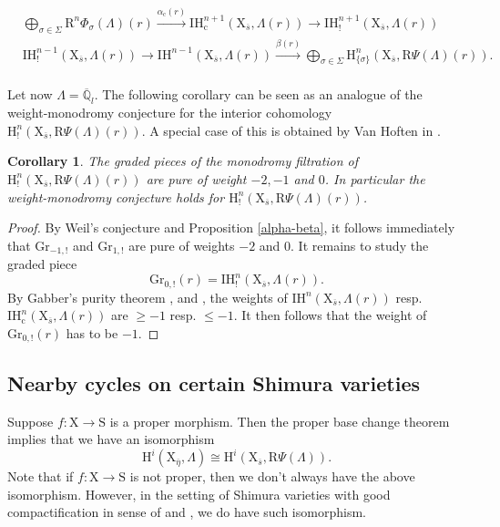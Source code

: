 \documentclass[10pt]{amsart}
\numberwithin{equation}{section}
\newtheorem{corollary}[equation]{Corollary}
\theoremstyle{definition}
\def\QQ{\mathbb{Q}}
\def\rmc{\mathrm{c}}
\def\rmH{\mathrm{H}}
\def\rmR{\mathrm{R}}
\def\rmS{\mathrm{S}}
\def\rmX{\mathrm{X}}
\begin{document}
\begin{equation*}
\begin{aligned}
&\bigoplus\limits_{\sigma\in\Sigma}\rmR^{n}\Phi_{\sigma}(\Lambda)(r) \xrightarrow{\alpha_{\rmc}(r)} \mathrm{IH}^{n+1}_{\rmc}(\rmX_{\overline{s}}, \Lambda(r))\rightarrow \mathrm{IH}^{n+1}_{!}(\rmX_{\overline{s}}, \Lambda(r))\\
&\mathrm{IH}^{n-1}_{!}(\rmX_{\overline{s}}, \Lambda(r))\rightarrow \mathrm{IH}^{n-1}(\rmX_{\overline{s}}, \Lambda(r)) \xrightarrow{\beta(r)}\bigoplus\limits_{\sigma\in\Sigma}\rmH^{n}_{\{\sigma\}}(\rmX_{\overline{s}}, \rmR\Psi(\Lambda)(r)).\\
\end{aligned}
\end{equation*}


Let now $\Lambda=\overline{\QQ}_{l}$. The following corollary can be seen as an analogue of the weight-monodromy conjecture for the interior cohomology $\rmH^{n}_{!}(\rmX_{\overline{s}}, \rmR\Psi(\Lambda)(r))$. A special case of this is obtained by Van Hoften in \cite[Theorem 1]{VH19}.

\begin{corollary}\label{WM}
The graded pieces of the monodromy filtration of $\mathrm{H}^{n}_{!}(\rmX_{\overline{s}}, \rmR\Psi(\Lambda)(r))$ are pure of weight $-2, -1$ and $0$. In particular the weight-monodromy conjecture holds for $\mathrm{H}^{n}_{!}(\rmX_{\overline{s}}, \rmR\Psi(\Lambda)(r))$.
\end{corollary} 
\begin{proof}
By Weil's conjecture and Proposition \ref{alpha-beta}, it follows immediately that $\mathrm{Gr}_{-1,!}$ and $\mathrm{Gr}_{1,!}$ are pure of weights $-2$ and $0$. It remains to study the graded piece 
\begin{equation*}
\mathrm{Gr}_{0,!}(r)=\mathrm{IH}^{n}_{!}(\rmX_{\overline{s}}, \Lambda(r)).
\end{equation*}
By Gabber's purity theorem \cite{Gab}, \cite[Corollaire 5.3.2]{BBD} and \cite[Stabilites 5.1.14]{BBD}, the weights of $\mathrm{IH}^{n}(\rmX_{\overline{s}}, \Lambda(r))$ resp.  $\mathrm{IH}^{n}_{\rmc}(\rmX_{\overline{s}}, \Lambda(r))$ are $\geq -1$ resp. $\leq -1$. It then follows that the weight of $\mathrm{Gr}_{0,!}(r)$ has to be $-1$.
\end{proof}

\subsection{Nearby cycles  on certain Shimura varieties} Suppose $f:\rmX\rightarrow \rmS$ is a proper morphism.  Then the proper base change theorem implies that we have an isomorphism 
\begin{equation*}
\rmH^{i}(\rmX_{\overline{\eta}}, \Lambda)\cong \rmH^{i}(\rmX_{\overline{s}}, \rmR\Psi(\Lambda)).
\end{equation*}
Note that if $f: \rmX\rightarrow \rmS$ is not proper, then we don't always have the above isomorphism. However, in the setting of Shimura varieties with good compactification in sense of \cite{LS18a} and \cite{LS18b}, we do have such isomorphism. 
\end{document}
